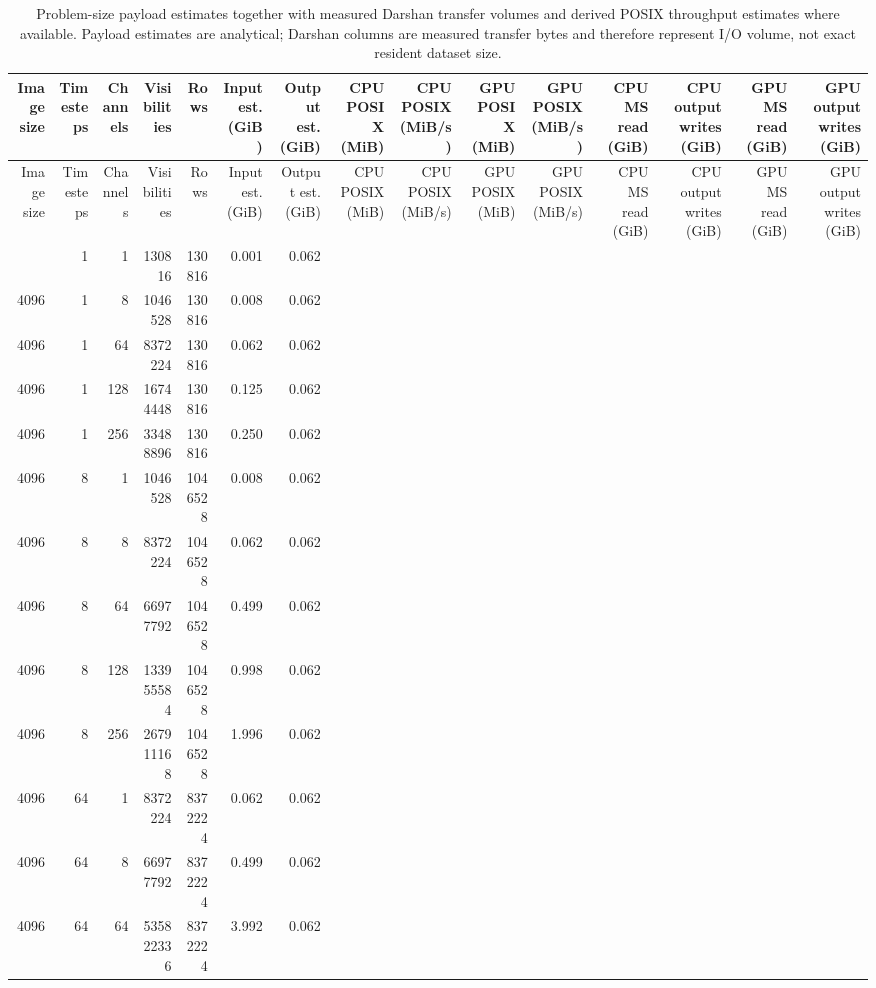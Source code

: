 \begin{longtable}{rrrrrrrrrrrrrrr}
\caption{Problem-size payload estimates together with measured Darshan transfer volumes and derived POSIX throughput estimates where available. Payload estimates are analytical; Darshan columns are measured transfer bytes and therefore represent I/O volume, not exact resident dataset size.}\\
\toprule
Image size & Timesteps & Channels & Visibilities & Rows & Input est. (GiB) & Output est. (GiB) & CPU POSIX (MiB) & CPU POSIX (MiB/s) & GPU POSIX (MiB) & GPU POSIX (MiB/s) & CPU MS read (GiB) & CPU output writes (GiB) & GPU MS read (GiB) & GPU output writes (GiB)\\
\midrule
\endfirsthead
\toprule
Image size & Timesteps & Channels & Visibilities & Rows & Input est. (GiB) & Output est. (GiB) & CPU POSIX (MiB) & CPU POSIX (MiB/s) & GPU POSIX (MiB) & GPU POSIX (MiB/s) & CPU MS read (GiB) & CPU output writes (GiB) & GPU MS read (GiB) & GPU output writes (GiB)\\
\midrule
\endhead
\bottomrule
\endfoot
4096 & 1 & 1 & 130816 & 130816 & 0.001 & 0.062 &  &  &  &  &  &  &  & \\
4096 & 1 & 8 & 1046528 & 130816 & 0.008 & 0.062 &  &  &  &  &  &  &  & \\
4096 & 1 & 64 & 8372224 & 130816 & 0.062 & 0.062 &  &  &  &  &  &  &  & \\
4096 & 1 & 128 & 16744448 & 130816 & 0.125 & 0.062 &  &  &  &  &  &  &  & \\
4096 & 1 & 256 & 33488896 & 130816 & 0.250 & 0.062 &  &  &  &  &  &  &  & \\
4096 & 8 & 1 & 1046528 & 1046528 & 0.008 & 0.062 &  &  &  &  &  &  &  & \\
4096 & 8 & 8 & 8372224 & 1046528 & 0.062 & 0.062 &  &  &  &  &  &  &  & \\
4096 & 8 & 64 & 66977792 & 1046528 & 0.499 & 0.062 &  &  &  &  &  &  &  & \\
4096 & 8 & 128 & 133955584 & 1046528 & 0.998 & 0.062 &  &  &  &  &  &  &  & \\
4096 & 8 & 256 & 267911168 & 1046528 & 1.996 & 0.062 &  &  &  &  &  &  &  & \\
4096 & 64 & 1 & 8372224 & 8372224 & 0.062 & 0.062 &  &  &  &  &  &  &  & \\
4096 & 64 & 8 & 66977792 & 8372224 & 0.499 & 0.062 &  &  &  &  &  &  &  & \\
4096 & 64 & 64 & 535822336 & 8372224 & 3.992 & 0.062 &  &  &  &  &  &  &  & \\

\end{longtable}
